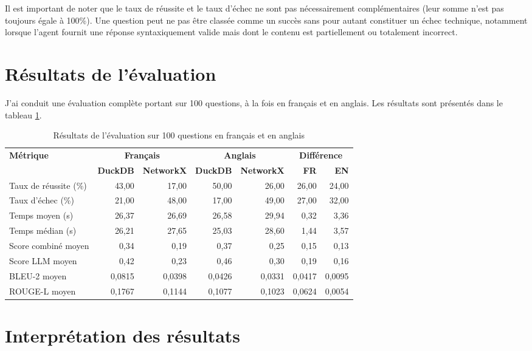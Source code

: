\documentclass[a4paper,11pt]{article}
\begin{document}
Il est important de noter que le taux de réussite et le taux d'échec ne sont pas nécessairement complémentaires (leur somme n'est pas toujours égale à 100\%). Une question peut ne pas être classée comme un succès sans pour autant constituer un échec technique, notamment lorsque l'agent fournit une réponse syntaxiquement valide mais dont le contenu est partiellement ou totalement incorrect.


\section{Résultats de l'évaluation}
\label{sec:resultats}


J'ai conduit une évaluation complète portant sur 100 questions, à la fois en français et en anglais. Les résultats sont présentés dans le tableau \ref{tab:resultats-eval}.

\begin{table}[H]
\small
\centering
\begin{tabular}{l|rr|rr|rr}
\toprule
\multirow{2}{*}{\textbf{Métrique}} & \multicolumn{2}{c|}{\textbf{Français}} & \multicolumn{2}{c|}{\textbf{Anglais}} & \multicolumn{2}{c}{\textbf{Différence}} \\
& \textbf{DuckDB} & \textbf{NetworkX} & \textbf{DuckDB} & \textbf{NetworkX} & \textbf{FR} & \textbf{EN} \\
\midrule
Taux de réussite (\%) & 43,00 & 17,00 & 50,00 & 26,00 & 26,00 & 24,00 \\
Taux d'échec (\%) & 21,00 & 48,00 & 17,00 & 49,00 & 27,00 & 32,00 \\
Temps moyen (s) & 26,37 & 26,69 & 26,58 & 29,94 & 0,32 & 3,36 \\
Temps médian (s) & 26,21 & 27,65 & 25,03 & 28,60 & 1,44 & 3,57 \\
Score combiné moyen & 0,34 & 0,19 & 0,37 & 0,25 & 0,15 & 0,13 \\
Score LLM moyen & 0,42 & 0,23 & 0,46 & 0,30 & 0,19 & 0,16 \\
BLEU-2 moyen & 0,0815 & 0,0398 & 0,0426 & 0,0331 & 0,0417 & 0,0095 \\
ROUGE-L moyen & 0,1767 & 0,1144 & 0,1077 & 0,1023 & 0,0624 & 0,0054 \\
\bottomrule
\end{tabular}
\caption{Résultats de l'évaluation sur 100 questions en français et en anglais}
\label{tab:resultats-eval}
\end{table}



\section{Interprétation des résultats}
\label{sec:interpretation}
\end{document}
